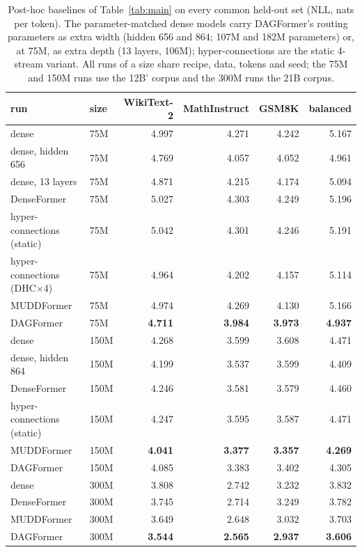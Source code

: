 \documentclass[11pt]{article}
\newcommand{\dagf}{DAGFormer}
\begin{document}
\begin{table}[t]
\centering\footnotesize
\setlength{\tabcolsep}{3pt}
\begin{tabular}{llrrrr}
\toprule
run & size & WikiText-2 & MathInstruct & GSM8K & balanced \\
\midrule
dense & 75M & 4.997 & 4.271 & 4.242 & 5.167 \\
dense, hidden 656 & 75M & 4.769 & 4.057 & 4.052 & 4.961 \\
dense, 13 layers & 75M & 4.871 & 4.215 & 4.174 & 5.094 \\
DenseFormer & 75M & 5.027 & 4.303 & 4.249 & 5.196 \\
hyper-connections (static) & 75M & 5.042 & 4.301 & 4.246 & 5.191 \\
hyper-connections (DHC$\times$4) & 75M & 4.964 & 4.202 & 4.157 & 5.114 \\
MUDDFormer & 75M & 4.974 & 4.269 & 4.130 & 5.166 \\
\dagf{} & 75M & \textbf{4.711} & \textbf{3.984} & \textbf{3.973} & \textbf{4.937} \\
\midrule
dense & 150M & 4.268 & 3.599 & 3.608 & 4.471 \\
dense, hidden 864 & 150M & 4.199 & 3.537 & 3.599 & 4.409 \\
DenseFormer & 150M & 4.246 & 3.581 & 3.579 & 4.460 \\
hyper-connections (static) & 150M & 4.247 & 3.595 & 3.587 & 4.471 \\
MUDDFormer & 150M & \textbf{4.041} & \textbf{3.377} & \textbf{3.357} & \textbf{4.269} \\
\dagf{} & 150M & 4.085 & 3.383 & 3.402 & 4.305 \\
\midrule
dense & 300M & 3.808 & 2.742 & 3.232 & 3.832 \\
DenseFormer & 300M & 3.745 & 2.714 & 3.249 & 3.782 \\
MUDDFormer & 300M & 3.649 & 2.648 & 3.032 & 3.703 \\
\dagf{} & 300M & \textbf{3.544} & \textbf{2.565} & \textbf{2.937} & \textbf{3.606} \\
\bottomrule
\end{tabular}
\caption{Post-hoc baselines of Table~\ref{tab:main} on every common held-out set (NLL, nats per token). The parameter-matched dense models carry \dagf{}'s routing parameters as extra width (hidden 656 and 864; 107M and 182M parameters) or, at 75M, as extra depth (13 layers, 106M); hyper-connections are the static 4-stream variant. All runs of a size share recipe, data, tokens and seed; the 75M and 150M runs use the 12B' corpus and the 300M runs the 21B corpus.}
\label{tab:posthoc_sets}
\end{table}
\end{document}
